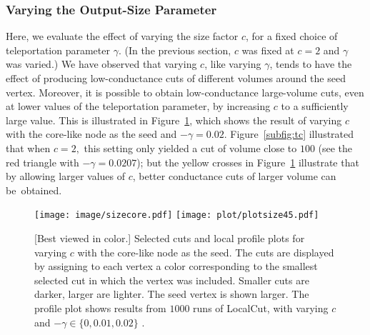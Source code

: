 \documentclass[11pt]{article}
\begin{document}
\subsubsection{Varying the Output-Size Parameter}
\label{sec:size}

Here, we evaluate the effect of varying the size factor $c$, for a fixed 
choice of teleportation parameter $\gamma$.
(In the previous section, $c$ was fixed at $c=2$ and $\gamma$ was varied.)
We have observed that varying $c$, like varying $\gamma$, tends to have the 
effect of producing low-conductance cuts of different volumes around the 
seed vertex. 
Moreover, it is possible to obtain low-conductance large-volume cuts, even 
at lower values of the teleportation parameter, by increasing $c$ to a 
sufficiently large value.
This is illustrated in Figure~\ref{fig:sizecore}, which shows the result of 
varying $c$ with the core-like node as the seed and $-\gamma = 0.02$. 
Figure~\ref{subfig:tc} illustrated that when $c=2,$ this setting only yielded 
a cut of volume close to $100$ (see the red triangle with $-\gamma=0.0207$);
but the yellow crosses in Figure~\ref{fig:sizecore} illustrate that by 
allowing larger values of $c$, better conductance cuts of larger volume can 
be~obtained. 

\begin{figure}[h]
\centering
\texttt{[image: image/sizecore.pdf]}
\hspace{.7in}
\texttt{[image: plot/plotsize45.pdf]}
\caption{[Best viewed in color.]  Selected cuts and local profile plots for varying $c$ with the core-like node as the seed. The cuts are displayed by assigning to each vertex a color corresponding to the smallest selected cut in which the vertex was included. Smaller cuts are darker, larger are lighter. The seed vertex is shown larger. The profile plot shows results from $1000$ runs of \textsf{LocalCut}, with varying $c$ and $-\gamma \in \{0, 0.01, 0.02\}$ . }
\label{fig:sizecore}
\end{figure}
\end{document}
